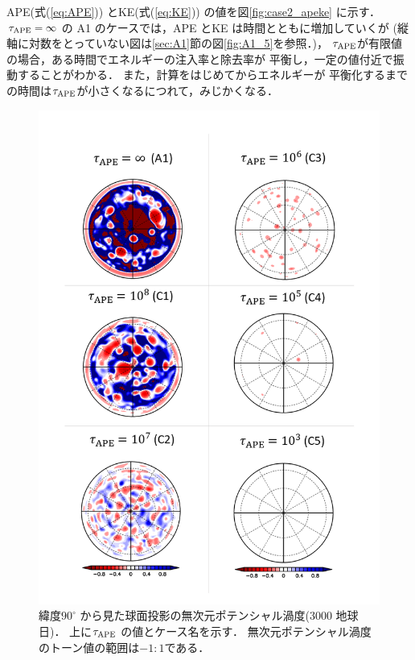 \documentclass[a4j,12pt,openbib,oneside]{jreport}
\begin{document}
APE(式(\ref{eq:APE})) とKE(式(\ref{eq:KE})) の値を図\ref{fig:case2_apeke} に示す．
$\tau_{\rm{APE}}=\infty$ の A1 のケースでは，APE とKE は時間とともに増加していくが
(縦軸に対数をとっていない図は\ref{sec:A1}節の図\ref{fig:A1_5}を参照．)，
$\tau_{\rm{APE}}$が有限値の場合，ある時間でエネルギーの注入率と除去率が
平衡し，一定の値付近で振動することがわかる．
また，計算をはじめてからエネルギーが
平衡化するまでの時間は$\tau_{\rm{APE}}$が小さくなるにつれて，みじかくなる．
%
\begin{figure}[ht]
  \begin{center}
    \includegraphics[clip,width=14cm]{./fig/result/case2/case2_nonqv.png}
    \caption{
      \footnotesize{緯度$90^\circ$ から見た球面投影の無次元ポテンシャル渦度(3000 地球日)．
上に$\tau_{\rm{APE}}$ の値とケース名を示す．
無次元ポテンシャル渦度のトーン値の範囲は$-1:1$である．
      }
    }
    \label{fig:case2_nonqv}
  \end{center}
\end{figure}
\end{document}

